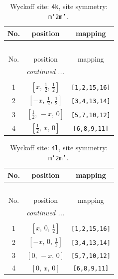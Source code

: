 \documentclass[fleqn,8pt]{jsarticle}
\begin{document}
\renewcommand{\arraystretch}{1.2}
\begin{longtable}{ccc}
\caption{Wyckoff site: {\tt 4k}, site symmetry: {\tt m'2m'.}}
 \\
 \hline \hline
No. & position & mapping \\ \hline \endfirsthead

\multicolumn{2}{l}{\tablename\ \thetable{}} \\
 \hline \hline
No. & position & mapping \\ \hline \endhead

 \hline \hline
\multicolumn{2}{r}{\footnotesize\it continued ...} \\ \endfoot

 \hline \hline
\multicolumn{2}{r}{} \\ \endlastfoot

1 & $\left[ x,\, \frac{1}{2},\, \frac{1}{2} \right]$ & {\tt [1,2,15,16]} \\ \hline
2 & $\left[ - x,\, \frac{1}{2},\, \frac{1}{2} \right]$ & {\tt [3,4,13,14]} \\ \hline
3 & $\left[ \frac{1}{2},\, - x,\, 0 \right]$ & {\tt [5,7,10,12]} \\ \hline
4 & $\left[ \frac{1}{2},\, x,\, 0 \right]$ & {\tt [6,8,9,11]} \\
\end{longtable}
\renewcommand{\arraystretch}{1.2}
\begin{longtable}{ccc}
\caption{Wyckoff site: {\tt 4l}, site symmetry: {\tt m'2m'.}}
 \\
 \hline \hline
No. & position & mapping \\ \hline \endfirsthead

\multicolumn{2}{l}{\tablename\ \thetable{}} \\
 \hline \hline
No. & position & mapping \\ \hline \endhead

 \hline \hline
\multicolumn{2}{r}{\footnotesize\it continued ...} \\ \endfoot

 \hline \hline
\multicolumn{2}{r}{} \\ \endlastfoot

1 & $\left[ x,\, 0,\, \frac{1}{2} \right]$ & {\tt [1,2,15,16]} \\ \hline
2 & $\left[ - x,\, 0,\, \frac{1}{2} \right]$ & {\tt [3,4,13,14]} \\ \hline
3 & $\left[ 0,\, - x,\, 0 \right]$ & {\tt [5,7,10,12]} \\ \hline
4 & $\left[ 0,\, x,\, 0 \right]$ & {\tt [6,8,9,11]} \\
\end{longtable}
\end{document}
